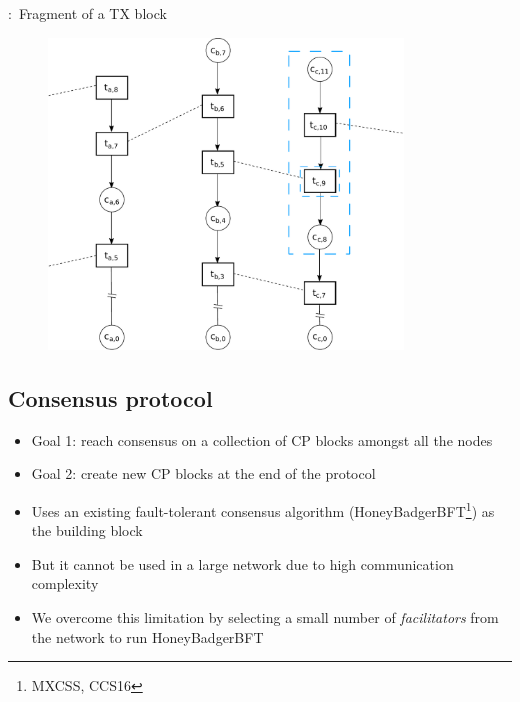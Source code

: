 \documentclass{beamer}
\begin{document}
\begin{frame}{\subsecname:~Fragment of a TX block}
  \begin{figure}[h]
  \includegraphics[width=0.84\textwidth]{trustchain-good-cp-frag}
  \centering
  \end{figure}
\end{frame}

\subsection{Consensus protocol}

\begin{frame}{\subsecname}
  \begin{itemize}
    \item Goal 1: reach consensus on a collection of CP blocks amongst all the nodes
    \item Goal 2: create new CP blocks at the end of the protocol
    \item Uses an existing fault-tolerant consensus algorithm (HoneyBadgerBFT\footnote{MXCSS, CCS16}) as the building block
    \item But it cannot be used in a large network due to high communication complexity
    \item We overcome this limitation by selecting a small number of \emph{facilitators} from the network to run HoneyBadgerBFT
  \end{itemize}
\end{frame}
\end{document}
